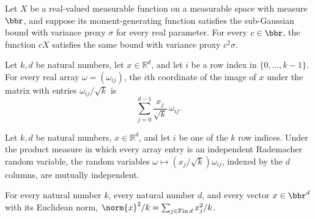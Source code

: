 \begin{lemma}
\label{hasSubgaussianMGF_const_mul}
\leanok
{}
Let $X$ be a real-valued measurable function on a measurable space with measure $\bbr$,
and suppose its moment-generating function satisfies the sub-Gaussian bound with
variance proxy $\sigma$ for every real parameter. For every $c\in\bbr$, the function
$cX$ satisfies the same bound with variance proxy $c^2\sigma$.
\end{lemma}

\begin{lemma}
\label{radMatrix_row_proj_eq_sum}
\leanok
{}
Let $k,d$ be natural numbers, let $x\in\mathbb{R}^d$, and let $i$ be a row index in
$\{0,\ldots,k-1\}$. For every real array $\omega=(\omega_{ij})$, the $i$th coordinate of
the image of $x$ under the matrix with entries $\omega_{ij}/\sqrt{k}$ is
\[
\sum_{j=0}^{d-1}\frac{x_j}{\sqrt{k}}\,\omega_{ij}.
\]
\end{lemma}

\begin{lemma}
\label{radMatrix_scaled_row_iid}
\leanok
{}
Let $k,d$ be natural numbers, $x\in\mathbb{R}^d$, and let $i$ be one of the $k$ row
indices. Under the product measure in which every array entry is an independent
Rademacher random variable, the random variables $\omega\mapsto
(x_j/\sqrt{k})\omega_{ij}$, indexed by the $d$ columns, are mutually independent.
\end{lemma}

\begin{lemma}
\label{norm_sq_div_eq_sum}
\leanok
{}
For every natural number $k$, every natural number $d$, and every vector $x\in\bbr^d$
with its Euclidean norm, $\norm{x}^2/k=\sum_{j\in\mathrm{Fin}\,d}x_j^2/k$.
\end{lemma}
